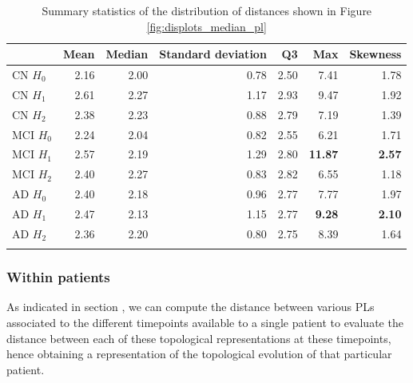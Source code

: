 \documentclass{article}
\begin{document}
\begin{table}
\centering
\begin{tabular}{lrrrrrr}
\toprule
{} &  Mean &  Median &  Standard deviation &   Q3 &   Max &  Skewness \\
\midrule
CN $H_0$ & 2.16 & 2.00 & 0.78 & 2.50 & 7.41 & 1.78 \\
CN $H_1$ & 2.61 & 2.27 & 1.17 & 2.93 & 9.47 & 1.92 \\
CN $H_2$ & 2.38 & 2.23 & 0.88 & 2.79 & 7.19 & 1.39 \\
MCI $H_0$ & 2.24 & 2.04 & 0.82 & 2.55 & 6.21 & 1.71 \\
MCI $H_1$ & 2.57 & 2.19 & 1.29 & 2.80 & \textbf{11.87} & \textbf{2.57} \\
MCI $H_2$ & 2.40 & 2.27 & 0.83 & 2.82 & 6.55 & 1.18 \\
AD $H_0$ & 2.40 & 2.18 & 0.96 & 2.77 & 7.77 & 1.97 \\
AD $H_1$ & 2.47 & 2.13 & 1.15 & 2.77 & \textbf{9.28} & \textbf{2.10} \\
AD $H_2$ & 2.36 & 2.20 & 0.80 & 2.75 & 8.39 & 1.64 \\
  \bottomrule
  \vspace{6pt}
\end{tabular}
\caption{Summary statistics of the distribution of distances shown in Figure \ref{fig:displots_median_pl}}
\label{tab:stats_median_pl}
\end{table}


\subsubsection{Within patients}

As indicated in section \label{sec:tda_setup}, we can compute the distance between various PLs associated to the different timepoints available to a single patient to evaluate the distance between each of these topological representations at these timepoints, hence obtaining a representation of the topological evolution of that particular patient.
\end{document}
